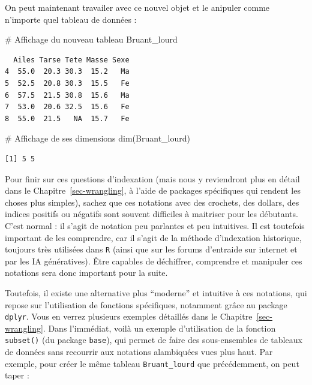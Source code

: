 \documentclass[
  a4paper,
  DIV=11,
  numbers=noendperiod,
  oneside]{scrreprt}
\newenvironment{Shaded}{}{}
\newcommand{\CommentTok}[1]{\textcolor[rgb]{0.42,0.45,0.49}{#1}}
\newcommand{\FunctionTok}[1]{\textcolor[rgb]{0.44,0.26,0.76}{#1}}
\newcommand{\NormalTok}[1]{\textcolor[rgb]{0.14,0.16,0.18}{#1}}
\begin{document}
On peut maintenant travailer avec ce nouvel objet et le anipuler comme
n'importe quel tableau de données :

\begin{Shaded}
\begin{Highlighting}[]
\CommentTok{\# Affichage du nouveau tableau}
\NormalTok{Bruant\_lourd}
\end{Highlighting}
\end{Shaded}

\begin{verbatim}
  Ailes Tarse Tete Masse Sexe
4  55.0  20.3 30.3  15.2   Ma
5  52.5  20.8 30.3  15.5   Fe
6  57.5  21.5 30.8  15.6   Ma
7  53.0  20.6 32.5  15.6   Fe
8  55.0  21.5   NA  15.7   Fe
\end{verbatim}

\begin{Shaded}
\begin{Highlighting}[]
\CommentTok{\# Affichage de ses dimensions}
\FunctionTok{dim}\NormalTok{(Bruant\_lourd)}
\end{Highlighting}
\end{Shaded}

\begin{verbatim}
[1] 5 5
\end{verbatim}

Pour finir sur ces questions d'indexation (mais nous y reviendront plus
en détail dans le Chapitre~\ref{sec-wrangling}, à l'aide de packages
spécifiques qui rendent les choses plus simples), sachez que ces
notations avec des crochets, des dollars, des indices positifs ou
négatifs sont souvent difficiles à maitriser pour les débutants. C'est
normal : il s'agit de notation peu parlantes et peu intuitives. Il est
toutefois important de les comprendre, car il s'agit de la méthode
d'indexation historique, toujours très utilisées dans \texttt{R} (ainsi
que sur les forums d'entraide sur internet et par les IA génératives).
Être capables de déchiffrer, comprendre et manipuler ces notations sera
donc important pour la suite.

Toutefois, il existe une alternative plus ``moderne'' et intuitive à ces
notations, qui repose sur l'utilisation de fonctions spécifiques,
notamment grâce au package \texttt{dplyr}. Vous en verrez plusieurs
exemples détaillés dans le Chapitre~\ref{sec-wrangling}. Dans
l'immédiat, voilà un exemple d'utilisation de la fonction
\texttt{subset()} (du package \texttt{base}), qui permet de faire des
sous-ensembles de tableaux de données sans recourrir aux notations
alambiquées vues plus haut. Par exemple, pour créer le même tableau
\texttt{Bruant\_lourd} que précédemment, on peut taper :
\end{document}
